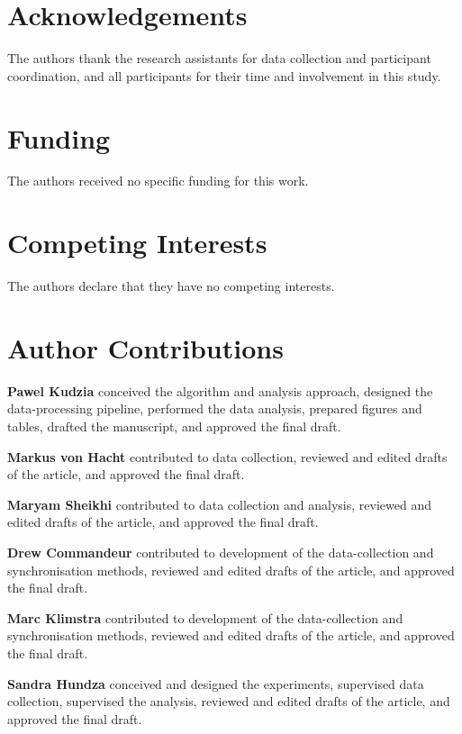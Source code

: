 \documentclass[fleqn,10pt,lineno]{wlpeerj}
\begin{document}
\clearpage
\section*{Acknowledgements}

The authors thank the research assistants for data collection and participant coordination, and all participants for their time and involvement in this study.

\section*{Funding}

The authors received no specific funding for this work.

\section*{Competing Interests}

The authors declare that they have no competing interests.

\section*{Author Contributions}

\textbf{Pawel Kudzia} conceived the algorithm and analysis approach, designed the data-processing pipeline, performed the data analysis, prepared figures and tables, drafted the manuscript, and approved the final draft.

\textbf{Markus von Hacht} contributed to data collection, reviewed and edited drafts of the article, and approved the final draft.

\textbf{Maryam Sheikhi} contributed to data collection and analysis, reviewed and edited drafts of the article, and approved the final draft.

\textbf{Drew Commandeur} contributed to development of the data-collection and synchronisation methods, reviewed and edited drafts of the article, and approved the final draft.

\textbf{Marc Klimstra} contributed to development of the data-collection and synchronisation methods, reviewed and edited drafts of the article, and approved the final draft.

\textbf{Sandra Hundza} conceived and designed the experiments, supervised data collection, supervised the analysis, reviewed and edited drafts of the article, and approved the final draft.
\end{document}
